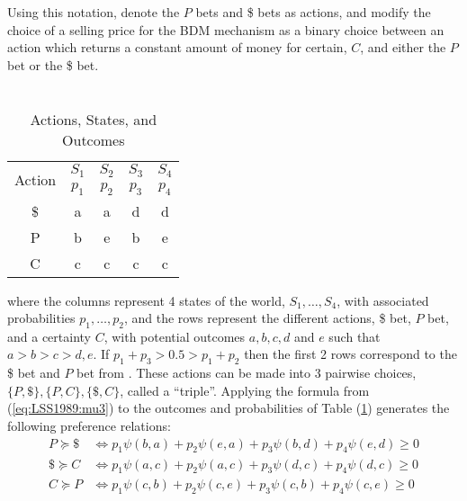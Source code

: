 \documentclass[../main.tex]{subfiles}
\begin{document}
Using this notation, \textcite{Loomes1989} denote the $P$ bets and {\$} bets as actions, and modify the choice of a selling price for the BDM mechanism as a binary choice between an action which returns a constant amount of money for certain, $C$, and either the $P$ bet or the {\$} bet.
\begin{table}[ht]
	\centering
	\caption{ \textcite[149]{Loomes1989} \\ Actions, States, and Outcomes }
	\label{tb:LSS1989:ASO}
	\begin{tabular}{ccccc}
		\multirow{2}{*}{Action} & $S_1$ & $S_2$ & $S_3$ & $S_4$ \\[-.75em]
		                        & $p_1$ & $p_2$ & $p_3$ & $p_4$ \\\hline
		                    {\$}  &   a   &   a   &   d   &   d   \\
		                    P   &   b   &   e   &   b   &   e   \\
		                    C   &   c   &   c   &   c   &   c   
	\end{tabular}
\end{table}
\noindent where the columns represent 4 states of the world, $S_1 , \ldots , S_4$, with associated probabilities $p_1, \ldots, p_2$, and the rows represent the different actions, {\$} bet, $P$ bet, and a certainty $C$, with potential outcomes $a,b,c,d$ and $e$ such that $a > b > c > d,e$.
If $p_1 + p_3 > 0.5 > p_1 + p_2$ then the first 2 rows correspond to the {\$} bet and $P$ bet from \textcite{Grether1979}.
These actions can be made into 3 pairwise choices, $\lbrace P , {\$} \rbrace , \lbrace P,C \rbrace , \lbrace {\$}, C \rbrace$, called a \enquote{triple}.
Applying the formula from (\ref{eq:LSS1989:mu3}) to the outcomes and probabilities of Table (\ref{tb:LSS1989:ASO}) generates the following preference relations:
\begin{align}
	P  \succcurlyeq {\$} &\Leftrightarrow p_1 \psi(b,a) + p_2 \psi(e,a) + p_3 \psi(b,d) + p_4 \psi(e,d) \geq 0 \label{eq:LSS1989:PD}\\
	{\$} \succcurlyeq C  &\Leftrightarrow p_1 \psi(a,c) + p_2 \psi(a,c) + p_3 \psi(d,c) + p_4 \psi(d,c) \geq 0 \label{eq:LSS1989:DC}\\
	C  \succcurlyeq P  &\Leftrightarrow p_1 \psi(c,b) + p_2 \psi(c,e) + p_3 \psi(c,b) + p_4 \psi(c,e) \geq 0 \label{eq:LSS1989:CP}
\end{align}
\end{document}
